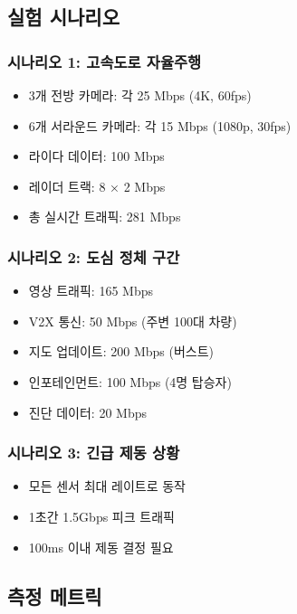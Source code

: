 \documentclass[twocolumn,10pt]{article}
\begin{document}
\subsection{실험 시나리오}

\subsubsection{시나리오 1: 고속도로 자율주행}
\begin{itemize}
    \item 3개 전방 카메라: 각 25 Mbps (4K, 60fps)
    \item 6개 서라운드 카메라: 각 15 Mbps (1080p, 30fps)
    \item 라이다 데이터: 100 Mbps
    \item 레이더 트랙: 8 × 2 Mbps
    \item 총 실시간 트래픽: 281 Mbps
\end{itemize}

\subsubsection{시나리오 2: 도심 정체 구간}
\begin{itemize}
    \item 영상 트래픽: 165 Mbps
    \item V2X 통신: 50 Mbps (주변 100대 차량)
    \item 지도 업데이트: 200 Mbps (버스트)
    \item 인포테인먼트: 100 Mbps (4명 탑승자)
    \item 진단 데이터: 20 Mbps
\end{itemize}

\subsubsection{시나리오 3: 긴급 제동 상황}
\begin{itemize}
    \item 모든 센서 최대 레이트로 동작
    \item 1초간 1.5Gbps 피크 트래픽
    \item 100ms 이내 제동 결정 필요
\end{itemize}

\subsection{측정 메트릭}
\end{document}
